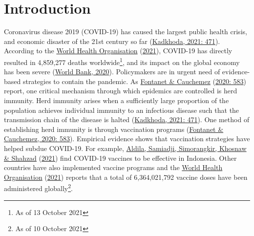 \documentclass[11pt,preprint, authoryear]{elsarticle}
\numberwithin{equation}{section}
\numberwithin{figure}{section}
\numberwithin{table}{section}
\let\rmarkdownfootnote\footnote%
\def\footnote{\protect\rmarkdownfootnote}
\begin{document}
\renewcommand{\contentsname}{Table of Contents}
{\tableofcontents}

\pagestyle{fancy}
\chead{}
\rhead{}
\lfoot{}
\lhead{}
\cfoot{}


\headsep 35pt %




\newpage

\hypertarget{introduction}{%
\section{\texorpdfstring{Introduction
\label{Introduction}}{Introduction }}\label{introduction}}

Coronavirus disease 2019 (COVID-19) has caused the largest public health
crisis, and economic disaster of the 21st century so far
(\protect\hyperlink{ref-bad}{Kadkhoda, 2021: 471}). According to the
\protect\hyperlink{ref-who}{World Health Organisation}
(\protect\hyperlink{ref-who}{2021}), COVID-19 has directly resulted in
4,859,277 deaths worldwide\footnote{As of 13 October 2021}, and its
impact on the global economy has been severe
(\protect\hyperlink{ref-bank}{World Bank, 2020}). Policymakers are in
urgent need of evidence-based strategies to contain the pandemic. As
\protect\hyperlink{ref-immun}{Fontanet \& Cauchemez}
(\protect\hyperlink{ref-immun}{2020: 583}) report, one critical
mechanism through which epidemics are controlled is herd immunity. Herd
immunity arises when a sufficiently large proportion of the population
achieves individual immunity to an infectious disease such that the
transmission chain of the disease is halted
(\protect\hyperlink{ref-bad}{Kadkhoda, 2021: 471}). One method of
establishing herd immunity is through vaccination programs
(\protect\hyperlink{ref-immun}{Fontanet \& Cauchemez, 2020: 583}).
Empirical evidence shows that vaccination strategies have helped subdue
COVID-19. For example, \protect\hyperlink{ref-erad}{Aldila, Samiadji,
Simorangkir, Khosnaw \& Shahzad} (\protect\hyperlink{ref-erad}{2021})
find COVID-19 vaccines to be effective in Indonesia. Other countries
have also implemented vaccine programs and the
\protect\hyperlink{ref-who}{World Health Organisation}
(\protect\hyperlink{ref-who}{2021}) reports that a total of
6,364,021,792 vaccine doses have been administered globally\footnote{As
  of 10 October 2021}.
\end{document}
